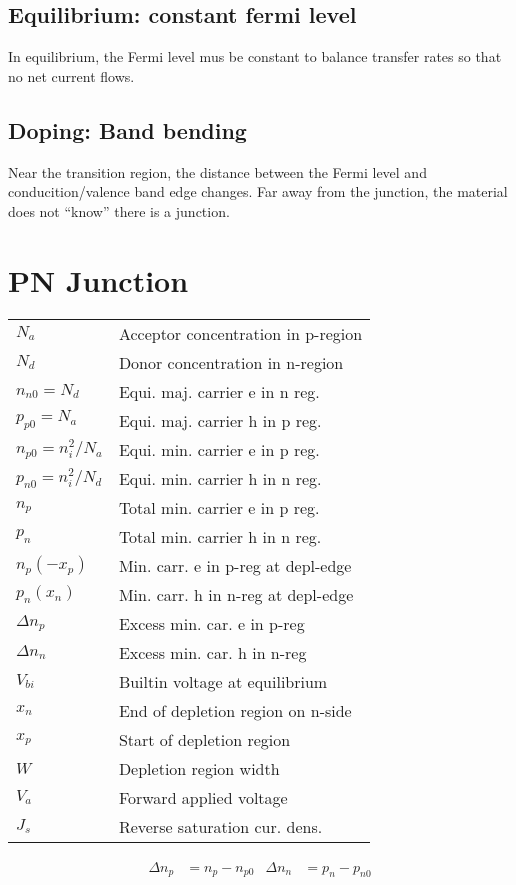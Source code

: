 \documentclass[a4paper, fontsize=8pt, landscape, DIV=1]{scrartcl}
\begin{document}
\begin{multicols*}{4}


  \subsection{Equilibrium: constant fermi level}
  In equilibrium, the Fermi level mus be constant to balance transfer rates so that no net current flows.


  \subsection{Doping: Band bending}
  Near the transition region, the distance between the Fermi level and conducition/valence band edge changes.
  Far away from the junction, the material does not ``know'' there is a junction.

  \section{PN Junction}
    \begin{tabular}[h]{l l}
      $N_a$   & Acceptor concentration in p-region \\
      $N_d$   & Donor concentration in n-region \\
      $n_{n0}=N_d$   & Equi. maj. carrier e in n reg. \\
      $p_{p0}=N_a$   & Equi. maj. carrier h in p reg. \\
      $n_{p0}=n_i^2/N_a$  & Equi. min. carrier e in p reg.  \\
      $p_{n0}=n_i^2/N_d$  & Equi. min. carrier h in n reg.  \\
      $n_p$   &  Total min. carrier e in p reg.\\
      $p_n$   &  Total min. carrier h in n reg.\\
      $n_p(-x_p)$   &  Min. carr. e in p-reg at depl-edge\\
      $p_n(x_n)$    &  Min. carr. h in n-reg at depl-edge\\
      $\Delta n_p$   & Excess min. car. e in p-reg \\
      $\Delta n_n$   & Excess min. car. h in n-reg \\
      $V_{bi}$& Builtin voltage at equilibrium \\
      $x_n$   & End of depletion region on n-side\\
      $x_p$   & Start of depletion region\\
      $W$     & Depletion region width\\
      $V_a$     & Forward applied voltage\\
      $J_s$     & Reverse saturation cur. dens.\\
    \end{tabular}
    \begin{align*}
      \Delta n_p &= n_p - n_{p0} & \Delta n_n &= p_n - p_{n0} \\
    \end{align*}


\end{multicols*}
\end{document}
